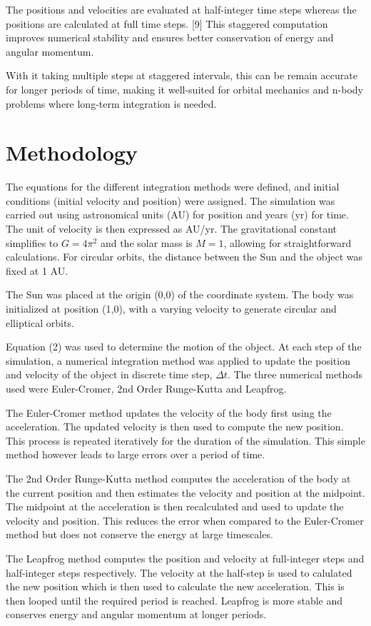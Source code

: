 \documentclass[11 pt, a4paper, twocolumn]{article}
\begin{document}
The positions and velocities are evaluated at half-integer time steps whereas the positions are 
calculated at full time steps. [9] This staggered computation improves numerical stability and
ensures better conservation of energy and angular momentum.

With it taking multiple steps at staggered intervals, this can be remain accurate for longer periods
of time, making it well-suited for orbital mechanics and n-body problems where long-term integration is needed.

\section{Methodology}
The equations for the different integration methods were defined, and initial conditions (initial 
velocity and position) were assigned. The simulation was carried out using astronomical units (AU) for
position and years (yr) for time. The unit of velocity is then expressed as AU/yr. The gravitational
constant simplifies to $G = 4 \pi^2$ and the solar mass is $M = 1$, allowing for straightforward
calculations. For circular orbits, the distance between the Sun and the object was fixed at 1 AU.

The Sun was placed at the origin (0,0) of the coordinate system. The body was initialized at
position (1,0), with a varying velocity to generate circular and elliptical orbits.

Equation (2) was used to determine the motion of the object. At each step of the simulation, a 
numerical integration method was applied to update the position and velocity of the object in discrete 
time step, $\Delta t$. The three numerical methods used were Euler-Cromer, 2nd Order Runge-Kutta and 
Leapfrog.

The Euler-Cromer method updates the velocity of the body first using the acceleration. The updated
velocity is then used to compute the new position. This process is repeated iteratively for the duration
of the simulation. This simple method however leads to large errors over a period of time.

The 2nd Order Runge-Kutta method computes the acceleration of the body at the current position and 
then estimates the velocity and position at the midpoint. The midpoint at the acceleration is then 
recalculated and used to update the velocity and position. This reduces the error when compared to 
the Euler-Cromer method but does not conserve the energy at large timescales.

The Leapfrog method computes the position and velocity at full-integer steps and half-integer steps
respectively. The velocity at the half-step is used to calulated the new position which is then used to
calculate the new acceleration. This is then looped until the required period is reached. Leapfrog is
more stable and conserves energy and angular momentum at longer periods.
\end{document}
